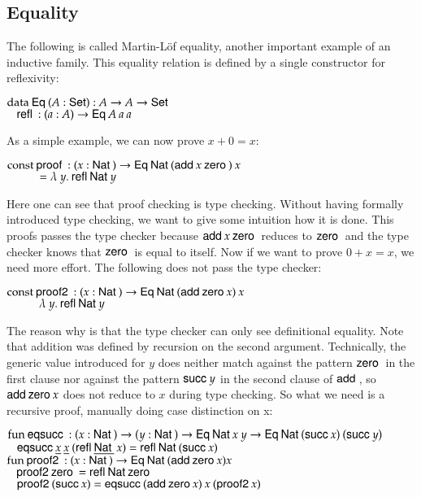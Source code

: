 \subsection{Equality}
The following is called Martin-L\"of equality, another important example of an inductive family.
This equality relation is defined by a single constructor for reflexivity:
\begin{bsp}
$\mathrm{data}\: \mathsf{Eq}\: ( A : \mathsf{Set} ) : A \rightarrow A \rightarrow \mathsf{Set} $ \\
$\hspace*{3mm} \mathsf{refl}\: : ( a : A ) \rightarrow{\mathsf{Eq}\:A \: a \: a}$
\end{bsp}
As a simple example, we can now prove $ x + 0 = x $:
\begin{bsp}
$ \mathrm{const}\: \mathsf{proof}\: : ( x : \mathsf{Nat}\: ) \rightarrow{\mathsf{Eq}\:\mathsf{Nat}\:(\mathsf{add}\:x \: \mathsf{zero}\:)\: x} $ \\ 
$ \spcx = \lam{y}\refl \Nat y$ 
\end{bsp}
Here one can see that proof checking is type checking.
Without having formally introduced type checking, we want to give some intuition how it is done.
This proofs passes the type checker because $\mathsf{add}\: x \: \mathsf{zero}\:$ reduces to $\mathsf{zero}\:$ and the type checker knows that $\mathsf{zero}\:$ is equal to itself.
Now if we want to prove $ 0 +  x = x $, we need more effort.
The following does not pass the type checker:
\begin{bsp}
$ \mathrm{const}\: \mathsf{proof2}\: : ( x : \mathsf{Nat}\: ) \rightarrow{\mathsf{Eq}\:\mathsf{Nat}\:(\mathsf{add}\:\mathsf{zero}\:x)\: x} $ \\ 
$ \spcx \lam{y} \refl \Nat y$ 
\end{bsp}
The reason why is that the type checker can only see definitional equality.
Note that addition was defined by recursion on the second argument.
Technically, the generic value introduced for $y$ does neither match against the pattern $\mathsf{zero}\:$ in the first clause
nor against the pattern $\mathsf{succ}\: y$ in the second clause of $\mathsf{add}\:$, so $\mathsf{add}\: \mathsf{zero}\: x$ does not reduce to $x$ during type checking.
So what we need is a recursive proof, manually doing case distinction on x:
\begin{bsp}
$\mathrm{fun}\: \mathsf{eqsucc}\: : ( x : \mathsf{Nat}\: ) \rightarrow( y : \mathsf{Nat}\: ) \rightarrow \mathsf{Eq}\: \mathsf{Nat}\: x \: y \rightarrow \mathsf{Eq}\: \mathsf{Nat}\: (\mathsf{succ}\: x) \: (\mathsf{succ}\: y)$ \\
$\hspace*{3mm} \mathsf{eqsucc}\: \underline{x} \: \underline{x} \: (\mathsf{refl}\: \underline{\mathsf{Nat}\:} \: x) = \mathsf{refl}\: \mathsf{Nat}\: (\mathsf{succ}\: x)$
\vs\\
$\mathrm{fun}\: \mathsf{proof2}\: : ( x : \mathsf{Nat}\: ) \rightarrow \mathsf{Eq}\: \mathsf{Nat}\: (\mathsf{add}\: \mathsf{zero}\: x) x$\\
$\hspace*{3mm} \mathsf{proof2}\: \mathsf{zero}\: = \mathsf{refl}\: \mathsf{Nat}\: \mathsf{zero}\:$\\
$\hspace*{3mm} \mathsf{proof2}\: (\mathsf{succ}\: x) = \mathsf{eqsucc}\: (\mathsf{add}\: \mathsf{zero}\: x)\: x \: (\mathsf{proof2}\: x)$
\end{bsp}

